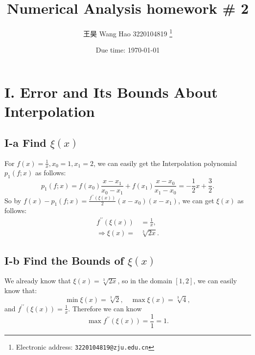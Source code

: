 \documentclass[a4paper]{article}
\begin{document}
\title{Numerical Analysis homework \# 2}

\author{王昊 Wang Hao 3220104819
  \thanks{Electronic address: \texttt{3220104819@zju.edu.cn}}}


\date{Due time: \today}

\maketitle



\section*{I. Error and Its Bounds About Interpolation}

\subsection*{I-a Find $\xi(x)$}

For $f(x) = \frac{1}{x}, x_0=1, x_1=2$, we can easily get the Interpolation polynomial $p_1(f; x)$ as follows:
\begin{equation}
  p_1(f; x) = f(x_0) \frac{x-x_1}{x_0-x_1} + f(x_1) \frac{x-x_0}{x_1-x_0} = -\frac{1}{2} x + \frac{3}{2} .
\end{equation}
So by $f(x) - p_1(f; x) = \frac{f^{\prime \prime} (\xi (x))}{2} (x-x_0) (x-x_1)$, we can get $\xi(x)$ as follows:
\begin{equation}
  \begin{aligned}
    f^{\prime \prime} (\xi (x)) &= \frac{1}{x}, \\
    \Rightarrow \xi (x) = &\sqrt[3]{2x}.
  \end{aligned}
\end{equation}
\subsection*{I-b Find the Bounds of $\xi(x)$}

We already know that $\xi(x) = \sqrt[3]{2x}$, so in the domain $[1,2]$, we can easily know that:
\begin{equation}
  \min \xi(x) = \sqrt[3]{2}, \quad \max \xi(x) = \sqrt[3]{4},
\end{equation}
and $f^{\prime \prime}(\xi(x)) = \frac{1}{x}$. Therefore we can know
\begin{equation}
  \max f^{\prime \prime}(\xi(x)) = \frac{1}{1} = 1. 
\end{equation}
\end{document}

